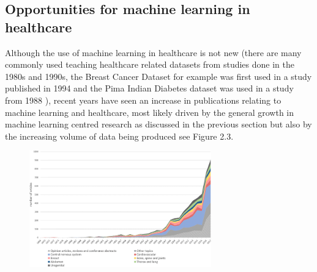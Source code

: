 \subsection{Opportunities for machine learning in healthcare}
Although the use of machine learning in healthcare is not new (there are many commonly used teaching healthcare related datasets from studies done in the 1980s and 1990s, the Breast Cancer Dataset for example was first used in a study published in 1994 \citep{OLMangasarian:1994ue} and the Pima Indian Diabetes dataset was used in a study from 1988 \citep{Smith:1988wy}), recent years have seen an increase in publications relating to machine learning and healthcare, most likely driven by the general growth in machine learning centred research as discussed in the previous section but also by the increasing volume of data being produced \citep{Pesapane:2018kv} see Figure 2.3.\newline

\begin{figure}[h]
\caption{}
\centering
\includegraphics[width=0.7\textwidth]{ThesisTemplate/usingLatex/images/PesapaneFig.png}
\end{figure}

